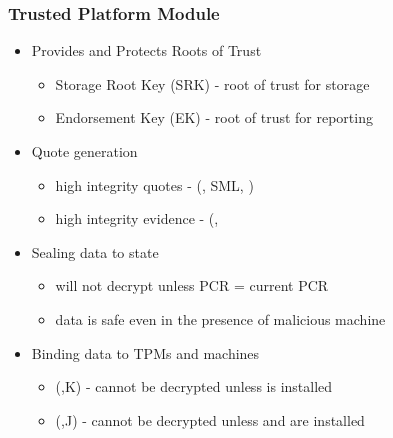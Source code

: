 \documentclass{beamer}
\begin{document}
\begin{frame}
  \frametitle{Trusted Platform Module}
  \begin{itemize}
  \item Provides and Protects Roots of Trust
    \begin{itemize}
    \item Storage Root Key (SRK) - root of trust for storage
    \item Endorsement Key (EK) - root of trust for reporting
    \end{itemize}
  \item Quote generation
    \begin{itemize}
    \item high integrity quotes - (, SML, )
    \item high integrity evidence - (, 
    \end{itemize}
  \item Sealing data to state
    \begin{itemize}
    \item {} will not decrypt unless PCR = current PCR
    \item data is safe even in the presence of malicious machine
    \end{itemize}
  \item Binding data to TPMs and machines
    \begin{itemize}
    \item (,K) -  cannot be decrypted unless  is installed
    \item (,J) -  cannot be decrypted
      unless  and  are installed
    \end{itemize}
  \end{itemize}
\end{frame}
\end{document}
